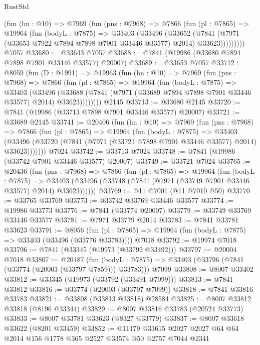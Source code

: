 \begin{lexlean}{RustStd}
\begin{coremodule}
{\begin{coremodule}
{{{{{{{{{{{{{{{{{{{{{{{{{{{{{{{{{{{{{{{{{{{{{{{{{{{{{{        (fun (hn : @10) =>
        @7969
          (fun (pns : @7968) =>
          @7866
            (fun (pl : @7865) =>
            @19964
              (fun (bodyL : @7875) =>
              @33403
                (@33496
                  (@33652
                    (@7841
                      (@7971 (@33653 @7922 @7894 @7898 @7901 @33446 @33577) @2014)
                      @33623)))))))))
    @7057
@33680 := @33643 @7057
@33688 := @7841 (@19986 (@33680 @7894 @7898 @7901 @33446 @33577) @20007)
@33689 := @33653 @7057
@33712 := @8059
    (fun (D : @1991) =>
    @19963
      (fun (hn : @10) =>
      @7969
        (fun (pns : @7968) =>
        @7866
          (fun (pl : @7865) =>
          @19964
            (fun (bodyL : @7875) =>
            @33403
              (@33496
                (@33688 (@7841 (@7971 (@33689 @7894 @7898 @7901 @33446 @33577) @2014) @33623))))))))
    @2145
@33713 := @33680 @2145
@33720 := @7841 (@19986 (@33713 @7898 @7901 @33446 @33577) @20007)
@33721 := @33689 @2145
@33741 := @20406
    (fun (hn : @10) =>
    @7969
      (fun (pns : @7968) =>
      @7866
        (fun (pl : @7865) =>
        @19964
          (fun (bodyL : @7875) =>
          @33403
            (@33496 (@33720 (@7841 (@7971 (@33721 @7898 @7901 @33446 @33577) @2014) @33623)))))))
    @7024
@33742 := @33713 @7024
@33748 := @7841 (@19986 (@33742 @7901 @33446 @33577) @20007)
@33749 := @33721 @7024
@33765 := @20436
    (fun (pns : @7968) =>
    @7866
      (fun (pl : @7865) =>
      @19964
        (fun (bodyL : @7875) =>
        @33403 (@33496 (@33748 (@7841 (@7971 (@33749 @7901 @33446 @33577) @2014) @33623))))))
@33769 := @11 @7001 (@11 @7010 @50)
@33770 := @33765 @33769
@33773 := @33742 @33769 @33446 @33577
@33774 := @19986 @33773
@33776 := @7841 (@33774 @20007)
@33779 := @33749 @33769 @33446 @33577
@33781 := @7971 @33779 @2014
@33783 := @7841 @33781 @33623
@33791 := @8056
    (fun (pl : @7865) => @19964 (fun (bodyL : @7875) => @33403 (@33496 (@33776 @33783))))
    @7018
@33792 := @19974 @7018
@33796 := @7841 (@33345 (@19973 (@33792 @33492)))
@33797 := @20004 @7018
@33807 := @20487
    (fun (bodyL : @7875) => @33403 (@33796 (@7841 (@33774 (@20003 (@33797 @7859))) @33783)))
    @7099
@33808 := @8007 @33402
@33812 := @33345 (@19973 (@33792 (@33491 @7099)))
@33813 := @7841 @33812
@33816 := @33774 (@20003 (@33797 @7099))
@33818 := @7841 @33816 @33783
@33821 := @33808 (@33813 @33818) @28584
@33825 := @8007 @33812 @33818 (@8196 @33344)
@33829 := @8007 @33816 @33783 (@20524 @33773)
@33833 := @8007 @33781 @33623 (@8327 @33779)
@33837 := @8007 @33618 @33622 (@8201 @33459)
@33852 := @11179 @33615 @2027 @2027 @64 @64 @2014 @156 @1778 @365 @2527 @33574 @50 @2757 @7044 @2341
}}}}}}}}}}}}}}}}}}}}}}}}}}}}}}}}}}}}}}}}}}}}}}}}}}}}}}
\end{coremodule}}
\end{coremodule}
\end{lexlean}
